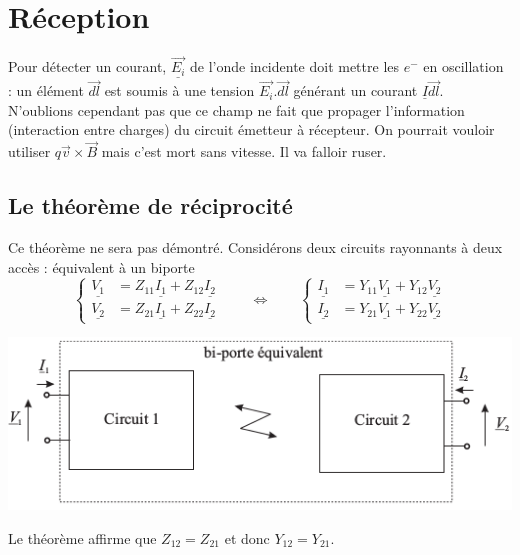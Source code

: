 \section{Réception}
Pour détecter un courant, $\underline{\vec{E_i}}$ de l'onde incidente doit mettre les $e^-$ 
en oscillation : un élément $\vec{dl}$ est soumis à une tension $\vec{E_i}.\vec{dl}$ générant 
un courant $\underline{I}\vec{dl}$. N'oublions cependant pas que ce champ ne fait que propager 
l'information (interaction entre charges) du circuit émetteur à récepteur. On pourrait 
vouloir utiliser $q\vec{v}\times\vec{B}$ mais c'est mort sans vitesse. Il va falloir ruser.

	\subsection{Le théorème de réciprocité}
	Ce théorème ne sera pas démontré. Considérons deux circuits rayonnants à deux accès : 
	équivalent à un biporte
	\begin{equation}
	\left\{\begin{array}{ll}
	\underline{V_1} &= Z_{11}\underline{I_1} +Z_{12}\underline{I_2}\\
	\underline{V_2} &= Z_{21}\underline{I_1} +Z_{22}\underline{I_2}	
	\end{array}\right.\qquad\Leftrightarrow\qquad
	\left\{\begin{array}{ll}
	\underline{I_1} &= Y_{11}\underline{V_1} + Y_{12}\underline{V_2}\\
	\underline{I_2} &= Y_{21}\underline{V_1} + Y_{22}\underline{V_2}	
	\end{array}\right.
	\end{equation}
	\begin{center}
	\includegraphics[scale=0.45]{ch4/image3.png}
	\end{center}
	Le théorème affirme que $Z_{12}=Z_{21}$ et donc $Y_{12}=Y_{21}$.
	
	
